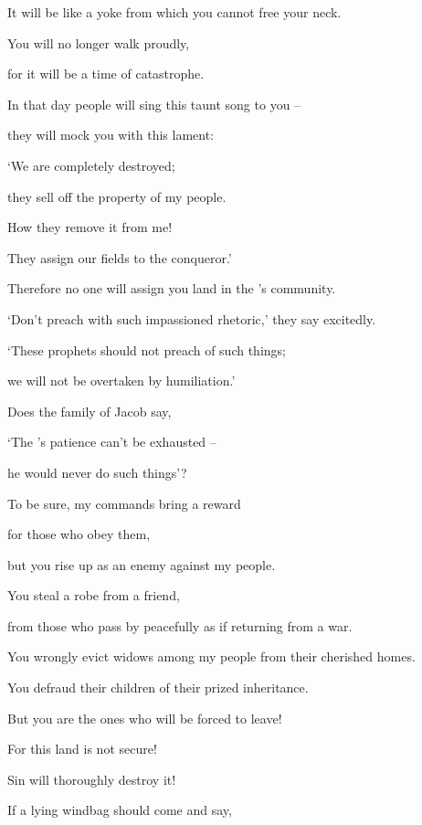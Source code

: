 {\par }{\Q It will be like
a yoke from
which
you cannot
free your neck.
\par }{\Q You will no
longer walk
proudly,
\par }{\Q for
it will be a time
of catastrophe.
\par }{\Q {}In that day
people will sing
this taunt song to you –
\par }{\Q they will mock you with this lament:
\par }{\Q ‘We are completely destroyed;
\par }{\Q they sell off the property of my people.
\par }{\Q How they remove it from me!
\par }{\Q They assign our fields to the conqueror.’
\par }{\Q {}Therefore
no
one will assign
you land
in the
{}’s
community.
\par }{\Q {}‘Don’t
preach
with such impassioned rhetoric,’ they say excitedly.
\par }{\Q ‘These
prophets should not preach
of such things;
\par }{\Q we will not
be overtaken by
humiliation.’
\par }{\Q {}Does the family
of Jacob
say,
\par }{\Q ‘The
{}’s
patience can’t be exhausted –
\par }{\Q he would never do such things’?
\par }{\Q To be sure, my commands bring a reward
\par }{\Q for those who obey them,
\par }{\Q {}but
you rise up
as an enemy
against
my people.
\par }{\Q You steal
a robe
from a friend,

\par }{\Q from those who pass by
peacefully
as if returning from
a war.
\par }{\Q {}You wrongly evict
widows among my people
from their cherished
homes.
\par }{\Q You defraud
their children
of their
prized inheritance.
\par }{\Q {}But you are the ones who will be forced
to leave!

\par }{\Q For
this
land is not
secure!

\par }{\Q Sin will thoroughly destroy it!
\par }{\Q {}If
a lying
windbag
should come
and say,

}
